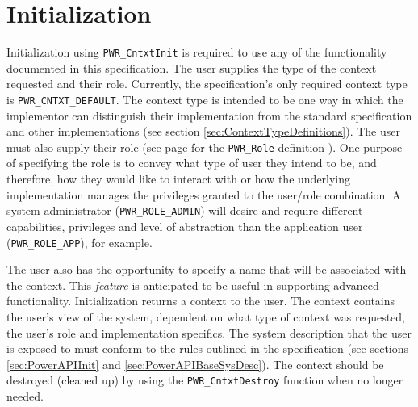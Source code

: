 \documentclass[12pt]{report} %
\providecommand{\DIFdelbegin}{} %
\providecommand{\DIFdelend}{} %
\newcommand{\DIFscaledelfig}{0.5}
\newlength{\DIFdelgraphicswidth} %
\newlength{\DIFdelgraphicsheight} %
\newcommand{\DIFdelincludegraphics}[2][]{%
\sbox{\DIFdelgraphicsbox}{\DIFOincludegraphics[#1]{#2}}%
\settoboxwidth{\DIFdelgraphicswidth}{\DIFdelgraphicsbox} %
\settoboxtotalheight{\DIFdelgraphicsheight}{\DIFdelgraphicsbox} %
\scalebox{\DIFscaledelfig}{%
\parbox[b]{\DIFdelgraphicswidth}{\usebox{\DIFdelgraphicsbox}\\[-\baselineskip] \rule{\DIFdelgraphicswidth}{0em}}\llap{\resizebox{\DIFdelgraphicswidth}{\DIFdelgraphicsheight}{%
\setlength{\unitlength}{\DIFdelgraphicswidth}%
\begin{picture}(1,1)%
\thicklines\linethickness{2pt} %
{\color[rgb]{1,0,0}\put(0,0){\framebox(1,1){}}}%
{\color[rgb]{1,0,0}\put(0,0){\line( 1,1){1}}}%
{\color[rgb]{1,0,0}\put(0,1){\line(1,-1){1}}}%
\end{picture}%
}\hspace*{3pt}}} %
} %
\DeclareRobustCommand{\DIFdelbegin}{\DIFOdelbegin \let\includegraphics\DIFdelincludegraphics} %
\DeclareRobustCommand{\DIFdelend}{\DIFOaddend \let\includegraphics\DIFOincludegraphics} %
\begin{document}

\section{Initialization}\label{sec:Initialization}

Initialization using \texttt{PWR_CntxtInit} is required to use any of the functionality documented in this specification.
The user supplies the type of the context requested and their role. 
Currently, the specification's only required context type is \texttt{PWR_CNTXT_DEFAULT}.
The context type is intended to be one way in which the implementor can distinguish their implementation from the standard specification and other implementations (see section \ref{sec:ContextTypeDefinitions}).
The user must also supply their role (see page \pageref{type:Role} for the \texttt{PWR_Role} definition\DIFdelbegin %
\DIFdelend ).
One purpose of specifying the role is to convey what type of user they intend to be, and therefore, how they would like to interact with or how the underlying implementation manages the privileges granted to the user/role combination.
A system administrator (\texttt{PWR_ROLE_ADMIN}) will desire and require different capabilities, privileges and level of abstraction than the application user (\texttt{PWR_ROLE_APP}), for example.

\DIFdelbegin %

\DIFdelend The user also has the opportunity to specify a name that will be associated with the context. 
This \textit{feature} is anticipated to be useful in supporting advanced functionality.
Initialization returns a context to the user.
The context contains the user's view of the system, dependent on what type of context was requested, the user's role and implementation specifics.
The system description that the user is exposed to must conform to the rules outlined in the specification (see sections \ref{sec:PowerAPIInit} and \ref{sec:PowerAPIBaseSysDesc}).
The context should be destroyed (cleaned up) by using the \texttt{PWR_CntxtDestroy} function when no longer needed.
\end{document}
